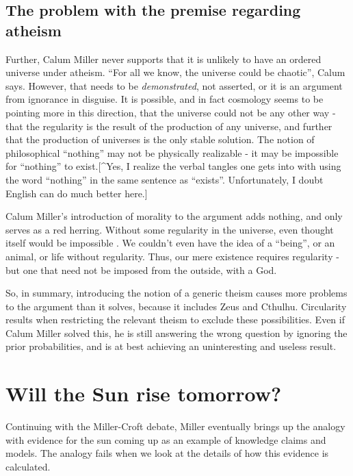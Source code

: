 \documentclass{tufte-book}
\begin{document}
\subsection{The problem with the premise regarding
atheism}\label{the-problem-with-the-premise-regarding-atheism}

Further, Calum Miller never supports that it is unlikely to have an
ordered universe under atheism. ``For all we know, the universe could be
chaotic'', Calum says. However, that needs to be \emph{demonstrated},
not asserted, or it is an argument from ignorance in disguise. It is
possible, and in fact cosmology seems to be pointing more in this
direction, that the universe could not be any other way - that the
regularity is the result of the production of any universe, and further
that the production of universes is the only stable solution. The notion
of philosophical ``nothing'' may not be physically realizable - it may
be impossible for ``nothing'' to exist.{[}\^{}Yes, I realize the verbal
tangles one gets into with using the word ``nothing'' in the same
sentence as ``exists''. Unfortunately, I doubt English can do much
better here.{]}

Calum Miller's introduction of morality to the argument adds nothing,
and only serves as a red herring. Without some regularity in the
universe, even thought itself would be impossible . We couldn't even
have the idea of a ``being'', or an animal, or life without regularity.
Thus, our mere existence requires regularity - but one that need not be
imposed from the outside, with a God.

So, in summary, introducing the notion of a generic theism causes more
problems to the argument than it solves, because it includes Zeus and
Cthulhu. Circularity results when restricting the relevant theism to
exclude these possibilities. Even if Calum Miller solved this, he is
still answering the wrong question by ignoring the prior probabilities,
and is at best achieving an uninteresting and useless result.

\section{Will the Sun rise tomorrow?}\label{will-the-sun-rise-tomorrow}

Continuing with the Miller-Croft debate, Miller eventually brings up the
analogy with evidence for the sun coming up as an example of knowledge
claims and models. The analogy fails when we look at the details of how
this evidence is calculated.
\end{document}

